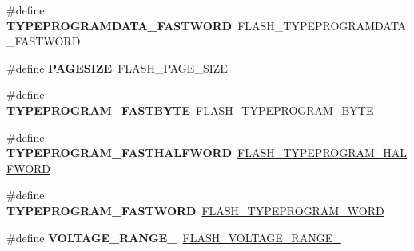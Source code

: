 \begin{DoxyCompactItemize}
\#define {\bfseries T\+Y\+P\+E\+P\+R\+O\+G\+R\+A\+M\+D\+A\+T\+A\+\_\+\+F\+A\+S\+T\+W\+O\+RD}~F\+L\+A\+S\+H\+\_\+\+T\+Y\+P\+E\+P\+R\+O\+G\+R\+A\+M\+D\+A\+T\+A\+\_\+\+F\+A\+S\+T\+W\+O\+RD
\item 
\mbox{\label{group___h_a_l___f_l_a_s_h___aliased___defines_ga519adc2af3ba06a8f0548b6690050a89}} 
\#define {\bfseries P\+A\+G\+E\+S\+I\+ZE}~F\+L\+A\+S\+H\+\_\+\+P\+A\+G\+E\+\_\+\+S\+I\+ZE
\item 
\mbox{\label{group___h_a_l___f_l_a_s_h___aliased___defines_ga07e4cba7de4bf96cfafa957245f9d06d}} 
\#define {\bfseries T\+Y\+P\+E\+P\+R\+O\+G\+R\+A\+M\+\_\+\+F\+A\+S\+T\+B\+Y\+TE}~\hyperlink{group___f_l_a_s_h___type___program_gac975d7139325057ed0069c6b55e4faed}{F\+L\+A\+S\+H\+\_\+\+T\+Y\+P\+E\+P\+R\+O\+G\+R\+A\+M\+\_\+\+B\+Y\+TE}
\item 
\mbox{\label{group___h_a_l___f_l_a_s_h___aliased___defines_gad562e3d208ce464a19d5ec356e7f21ff}} 
\#define {\bfseries T\+Y\+P\+E\+P\+R\+O\+G\+R\+A\+M\+\_\+\+F\+A\+S\+T\+H\+A\+L\+F\+W\+O\+RD}~\hyperlink{group___f_l_a_s_h___type___program_ga2b607dfc2efd463a8530e327bc755582}{F\+L\+A\+S\+H\+\_\+\+T\+Y\+P\+E\+P\+R\+O\+G\+R\+A\+M\+\_\+\+H\+A\+L\+F\+W\+O\+RD}
\item 
\mbox{\label{group___h_a_l___f_l_a_s_h___aliased___defines_ga1c170a7eba13377a1922bf6750b1f0ce}} 
\#define {\bfseries T\+Y\+P\+E\+P\+R\+O\+G\+R\+A\+M\+\_\+\+F\+A\+S\+T\+W\+O\+RD}~\hyperlink{group___f_l_a_s_h___type___program_gadd25c6821539030ba6711e7c0d586c3e}{F\+L\+A\+S\+H\+\_\+\+T\+Y\+P\+E\+P\+R\+O\+G\+R\+A\+M\+\_\+\+W\+O\+RD}
\item 
\mbox{\label{group___h_a_l___f_l_a_s_h___aliased___defines_ga5a1b1ceafccd5ab37c7cfbebc9527329}} 
\#define {\bfseries V\+O\+L\+T\+A\+G\+E\+\_\+\+R\+A\+N\+G\+E\+\_}~\hyperlink{group___f_l_a_s_h_ex___voltage___range_ga5cadf49a63c968cde3b980e5139d398e}{F\+L\+A\+S\+H\+\_\+\+V\+O\+L\+T\+A\+G\+E\+\_\+\+R\+A\+N\+G\+E\+\_}
\item 
\mbox{\label{group___h_a_l___f_l_a_s_h___aliased___defines_ga1c0639cea187d17c4dad607fe124a94f}} 

\end{DoxyCompactItemize}
